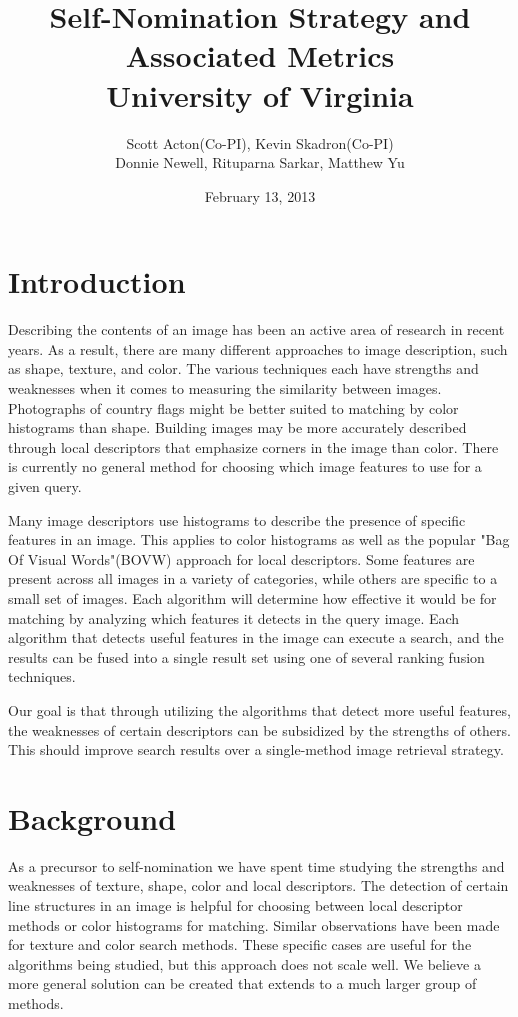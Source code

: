 \documentclass[12pt]{article}
\begin{document}
\title{Self-Nomination Strategy and Associated Metrics \\ University of Virginia}

\author{Scott Acton(Co-PI), Kevin Skadron(Co-PI) \\ Donnie Newell, Rituparna Sarkar, Matthew Yu}

\date{February 13, 2013}
\maketitle

\section{Introduction}
Describing the contents of an image has been an active area of research in recent years. As a result, there are many different approaches to image description, such as shape, texture, and color. The various techniques each have strengths and weaknesses when it comes to measuring the similarity between images. Photographs of country flags might be better suited to matching by color histograms than shape. Building images may be more accurately described through local descriptors that emphasize corners in the image than color. There is currently no general method for choosing which image features to use for a given query.

Many image descriptors use histograms to describe the presence of specific features in an image. This applies to color histograms as well as the popular "Bag Of Visual Words"(BOVW) approach for local descriptors\cite{1541280}. Some features are present across all images in a variety of categories, while others are specific to a small set of images. Each algorithm will determine how effective it would be for matching by analyzing which features it detects in the query image. Each algorithm that detects useful features in the image can execute a search, and the results can be fused into a single result set using one of several ranking fusion techniques.

Our goal is that through utilizing the algorithms that detect more useful features, the weaknesses of certain descriptors can be subsidized by the strengths of others. This should improve search results over a single-method image retrieval strategy.

\section{Background}
As a precursor to self-nomination we have spent time studying the strengths and weaknesses of texture, shape, color and local descriptors. The detection of certain line structures in an image is helpful for choosing between local descriptor methods or color histograms for matching. Similar observations have been made for texture and color search methods. These specific cases are useful for the algorithms being studied, but this approach does not scale well. We believe a more general solution can be created that extends to a much larger group of methods.
\end{document}
